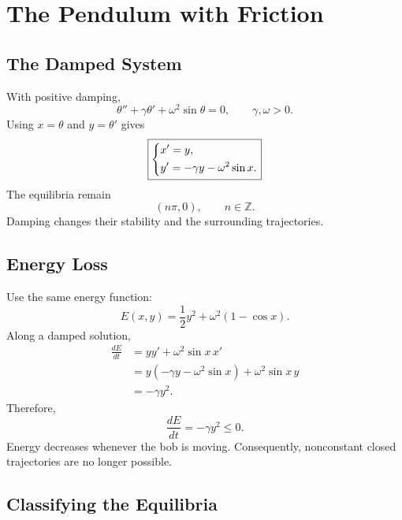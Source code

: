 \documentclass[11pt,letterpaper]{article}
\begin{document}
\section{The Pendulum with Friction}

\subsection{The Damped System}

With positive damping,
\[
\theta''+\gamma\theta'+\omega^2\sin\theta=0,
\qquad \gamma,\omega>0.
\]
Using $x=\theta$ and $y=\theta'$ gives
\[
\boxed{
\begin{dcases}
x'=y,\\
y'=-\gamma y-\omega^2\sin x.
\end{dcases}
}
\]
The equilibria remain
\[
\boxed{(n\pi,0),\qquad n\in\mathbb Z.}
\]
Damping changes their stability and the surrounding
trajectories.

\subsection{Energy Loss}

Use the same energy function:
\[
E(x,y)=\frac12y^2+\omega^2(1-\cos x).
\]
Along a damped solution,
\begin{align*}
\frac{dE}{dt}
&=yy'+\omega^2\sin x\,x'\\
&=y(-\gamma y-\omega^2\sin x)
+\omega^2\sin x\,y\\
&=-\gamma y^2.
\end{align*}
Therefore,
\[
\boxed{\frac{dE}{dt}=-\gamma y^2\le0.}
\]
Energy decreases whenever the bob is moving.
Consequently, nonconstant closed trajectories
are no longer possible.

\subsection{Classifying the Equilibria}
\end{document}

